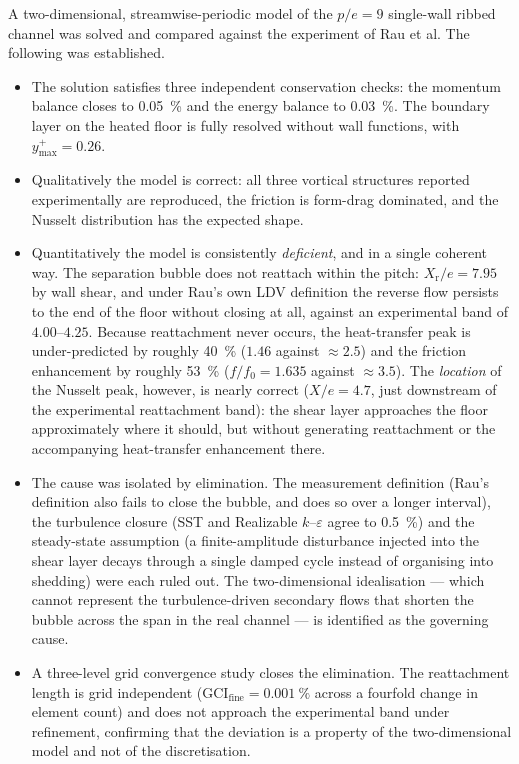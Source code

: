 \documentclass[11pt,a4paper]{article}
\newcommand{\Xr}{X_{\mathrm{r}}}
\begin{document}
A two-dimensional, streamwise-periodic model of the $p/e = 9$ single-wall
ribbed channel was solved and compared against the experiment of
Rau et al. The following was established.

\begin{itemize}
  \item The solution satisfies three independent conservation checks: the
  momentum balance closes to \SI{0.05}{\percent} and the energy balance to
  \SI{0.03}{\percent}. The boundary layer on the heated floor is fully
  resolved without wall functions, with $y^{+}_{\max} = 0.26$.

  \item Qualitatively the model is correct: all three vortical structures
  reported experimentally are reproduced, the friction is form-drag
  dominated, and the Nusselt distribution has the expected shape.

  \item Quantitatively the model is consistently \emph{deficient}, and in a
  single coherent way. The separation bubble does not reattach within the
  pitch: $\Xr/e = 7.95$ by wall shear, and under Rau's own LDV definition
  the reverse flow persists to the end of the floor without closing at all,
  against an experimental band of $4.00$--$4.25$. Because reattachment never
  occurs, the heat-transfer peak is under-predicted by roughly
  \SI{40}{\percent} ($1.46$ against $\approx 2.5$) and the friction
  enhancement by roughly \SI{53}{\percent} ($f/f_{0} = 1.635$ against
  $\approx 3.5$). The \emph{location} of the Nusselt peak, however, is
  nearly correct ($X/e = 4.7$, just downstream of the experimental
  reattachment band): the shear layer approaches the floor approximately
  where it should, but without generating reattachment or the accompanying
  heat-transfer enhancement there.

  \item The cause was isolated by elimination. The measurement definition
  (Rau's definition also fails to close the bubble, and does so over a
  longer interval), the turbulence closure (SST and Realizable
  $k$--$\varepsilon$ agree to \SI{0.5}{\percent}) and the steady-state
  assumption (a finite-amplitude disturbance injected into the shear layer
  decays through a single damped cycle instead of organising into shedding)
  were each ruled out. The two-dimensional idealisation --- which cannot
  represent the turbulence-driven secondary flows that shorten the bubble
  across the span in the real channel --- is identified as the governing
  cause.

  \item A three-level grid convergence study closes the elimination. The
  reattachment length is grid independent (GCI$_{\text{fine}} =
  \SI{0.001}{\percent}$ across a fourfold change in element count) and does
  not approach the experimental band under refinement, confirming that the
  deviation is a property of the two-dimensional model and not of the
  discretisation.
\end{itemize}
\end{document}

